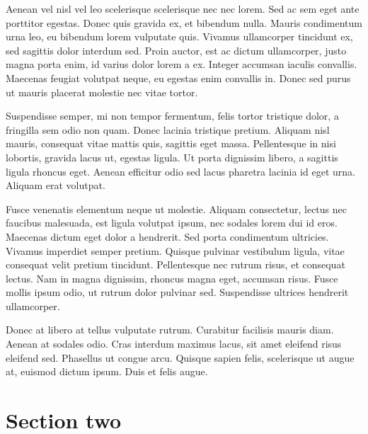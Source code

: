 Aenean vel nisl vel leo scelerisque scelerisque nec nec lorem. Sed ac sem eget ante porttitor egestas. Donec quis gravida ex, et bibendum nulla. Mauris condimentum urna leo, eu bibendum lorem vulputate quis. Vivamus ullamcorper tincidunt ex, sed sagittis dolor interdum sed. Proin auctor, est ac dictum ullamcorper, justo magna porta enim, id varius dolor lorem a ex. Integer accumsan iaculis convallis. Maecenas feugiat volutpat neque, eu egestas enim convallis in. Donec sed purus ut mauris placerat molestie nec vitae tortor.

Suspendisse semper, mi non tempor fermentum, felis tortor tristique dolor, a fringilla sem odio non quam. Donec lacinia tristique pretium. Aliquam nisl mauris, consequat vitae mattis quis, sagittis eget massa. Pellentesque in nisi lobortis, gravida lacus ut, egestas ligula. Ut porta dignissim libero, a sagittis ligula rhoncus eget. Aenean efficitur odio sed lacus pharetra lacinia id eget urna. Aliquam erat volutpat.

Fusce venenatis elementum neque ut molestie. Aliquam consectetur, lectus nec faucibus malesuada, est ligula volutpat ipsum, nec sodales lorem dui id eros. Maecenas dictum eget dolor a hendrerit. Sed porta condimentum ultricies. Vivamus imperdiet semper pretium. Quisque pulvinar vestibulum ligula, vitae consequat velit pretium tincidunt. Pellentesque nec rutrum risus, et consequat lectus. Nam in magna dignissim, rhoncus magna eget, accumsan risus. Fusce mollis ipsum odio, ut rutrum dolor pulvinar sed. Suspendisse ultrices hendrerit ullamcorper.

Donec at libero at tellus vulputate rutrum. Curabitur facilisis mauris diam. Aenean at sodales odio. Cras interdum maximus lacus, sit amet eleifend risus eleifend sed. Phasellus ut congue arcu. Quisque sapien felis, scelerisque ut augue at, euismod dictum ipsum. Duis et felis augue.
\section{Section two}
